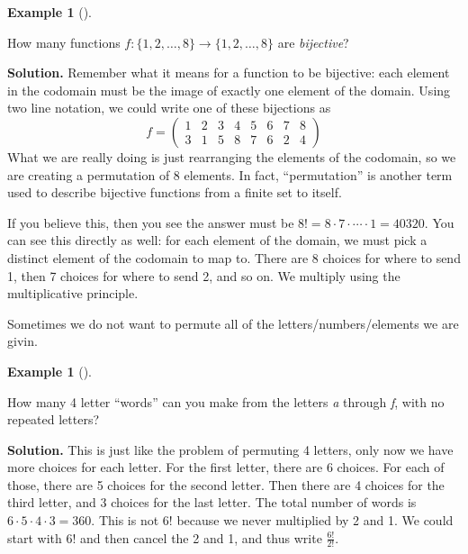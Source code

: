 \documentclass[10pt,]{book}
\theoremstyle{plain}
\theoremstyle{definition}
\newtheorem{example}[theorem]{Example}
\theoremstyle{definition}
\theoremstyle{definition}
\numberwithin{equation}{section}
\newcommand{\twoline}[2]{\begin{pmatrix}#1 \\ #2 \end{pmatrix}}
\newcommand{\amp}{ & }
\begin{document}
\begin{example}[]\label{example-31}

          How many functions \(f:\{1,2,\ldots,8\} \to \{1,2,\ldots, 8\}\) are \emph{bijective}?
\par\medskip\noindent%
\textbf{Solution.}\quad 
          Remember what it means for a function to be bijective: each element in the codomain must be the image of exactly one element of the domain. Using two line notation, we could write one of these bijections as
          \begin{equation*}
            f = \twoline{1 \amp 2 \amp 3 \amp 4 \amp 5 \amp 6 \amp 7 \amp 8} {3 \amp 1 \amp 5 \amp 8 \amp 7 \amp 6 \amp 2 \amp 4}
          \end{equation*}
          What we are really doing is just rearranging the elements of the codomain, so we are creating a permutation of 8 elements. In fact, ``permutation'' is another term used to describe bijective functions from a finite set to itself.
\par

          If you believe this, then you see the answer must be \(8! = 8 \cdot 7 \cdot\cdots\cdot 1 = 40320\). You can see this directly as well: for each element of the domain, we must pick a distinct element of the codomain to map to. There are 8 choices for where to send 1, then 7 choices for where to send 2, and so on. We multiply using the multiplicative principle.
\end{example}
\par

        Sometimes we do not want to permute all of the letters/numbers/elements we are givin.
\begin{example}[]\label{example-32}

            How many 4 letter ``words'' can you make from the letters \emph{a} through \emph{f}, with no repeated letters?
\par\medskip\noindent%
\textbf{Solution.}\quad 
            This is just like the problem of permuting 4 letters, only now we have more choices for each letter. For the first letter, there are 6 choices. For each of those, there are 5 choices for the second letter. Then there are 4 choices for the third letter, and 3 choices for the last letter. The total number of words is \(6\cdot 5\cdot 4 \cdot 3 = 360\). This is not \(6!\) because we never multiplied by 2 and 1. We could start with \(6!\) and then cancel the 2 and 1, and thus write \(\frac{6!}{2!}\).
\end{example}
\par
\end{document}
